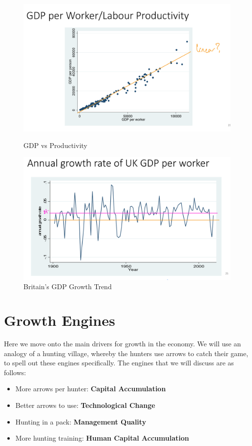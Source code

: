 \documentclass[12pt, letterpaper]{article}
\begin{document}
\begin{figure}[h]
	\begin{minipage}{.45\textwidth}
		\centering
		\includegraphics[width=.7\textwidth]{gdp_productivity_1}
		\caption{GDP vs Productivity}
		\label{fig:gdp_productivity_1}
	\end{minipage}\hfill
	\begin{minipage}{.45\textwidth}
		\centering
		\includegraphics[width=.7\textwidth]{britain_gdp_3}
		\caption{Britain's GDP Growth Trend}
		\label{fig:britain_gdp_3}
	\end{minipage}
	
\end{figure}

\newpage
\section{Growth Engines}
Here we move onto the main drivers for growth in the economy. We will use an analogy of a hunting village, whereby the hunters use arrows to catch their game, to spell out these engines specifically. The engines that we will discuss are as follows:
\begin{itemize}
	\item More arrows per hunter: \textbf{Capital Accumulation}
	\item Better arrows to use: \textbf{Technological Change}
	\item Hunting in a pack: \textbf{Management Quality}
	\item More hunting training: \textbf{Human Capital Accumulation}
\end{itemize}
\end{document}
